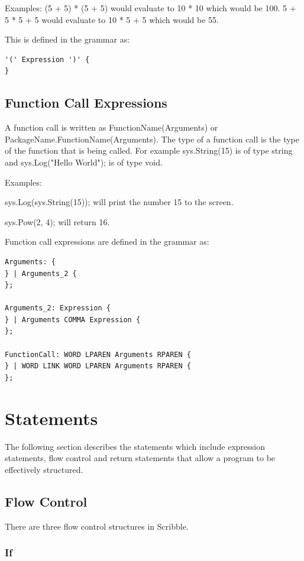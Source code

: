 \documentclass[]{final_report}
\begin{document}
Examples: (5 + 5) * (5 + 5) would evaluate to 10 * 10 which would be 100. 5 + 5 * 5 + 5 would evaluate to 10 * 5 + 5 which would be 55.

This is defined in the grammar as:
\begin{verbatim}
'(' Expression ')' {
}
\end{verbatim}

\subsection{Function Call Expressions}

A function call is written as FunctionName(Arguments) or PackageName.FunctionName(Arguments). The type of a function call is the type of the function that is being called. For example sys.String(15) is of type string and sys.Log("Hello World"); is of type void.

Examples:

sys.Log(sys.String(15)); will print the number 15 to the screen.

sys.Pow(2, 4); will return 16.

Function call expressions are defined in the grammar as:
\begin{verbatim}
Arguments: {
} | Arguments_2 {
};

Arguments_2: Expression {
} | Arguments COMMA Expression {
};

FunctionCall: WORD LPAREN Arguments RPAREN {
} | WORD LINK WORD LPAREN Arguments RPAREN {
};
\end{verbatim}

\section{Statements}

The following section describes the statements which include expression statements, flow control and return statements that allow a program to be effectively structured.

\subsection{Flow Control}

There are three flow control structures in Scribble.

\subsubsection{If}
\end{document}
